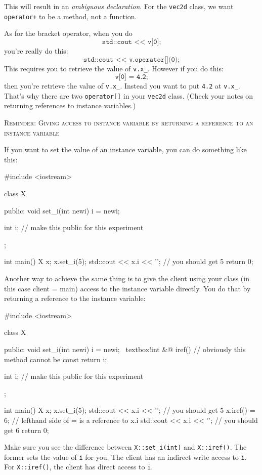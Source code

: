 This will result in an \textit{ambiguous declaration}.
For the \verb!vec2d! class, we want \verb!operator+! to be a method,
not a function.

As for the bracket operator, when you do
\[
	\texttt{std::cout << v[0];}
\]
you're really do this:
\[
	\texttt{std::cout << v.operator[](0);}
\]
This requires you to retrieve the value of \verb!v.x_!.
However if you do this:
\[
	\texttt{v[0] = 4.2;}
\]
then you're retrieve the value of \verb!v.x_!.
Instead you want to put \verb!4.2! at \verb!v.x_!.
That's why there are two \verb!operator[]! in your
\verb!vec2d! class.
(Check your notes on returning references to instance variables.)

\newpage
\textsc{Reminder: Giving access to instance variable by returning a reference
  to an instance variable}

If you want to set the value of an instance variable, you can do something
like this:
{\small
\begin{console}
#include <iostream>

class X
{
public:
    void set_i(int newi)
    {
        i = newi;
    }

    int i; // make this public for this experiment
};

int main()
{
    X x;
    x.set_i(5);
    std::cout << x.i << '\n'; // you should get 5
    return 0;
}
\end{console}
}
Another way to achieve the same thing is to give the client using your
class (in this
case client = main) access to the instance variable directly. You do that by
returning a reference to the instance variable:
{\small
\begin{console}[commandchars=\~\!\@]
#include <iostream>

class X
{
public:
    void set_i(int newi)
    {
        i = newi;
    }
    ~textbox!int &@ iref() // obviously this method cannot be const
    {
        return i;
    }

    int i; // make this public for this experiment
};

int main()
{
    X x;
    x.set_i(5);
    std::cout << x.i << '\n'; // you should get 5
    x.iref() = 6;             // lefthand side of = is a reference to x.i
    std::cout << x.i << '\n'; // you should get 6
    return 0;
}
\end{console}
}

Make sure you see the difference between \verb!X::set_i(int)! and
\verb!X::iref()!.
The former sets the value of \verb!i! for you.
The client has an indirect write access to \verb!i!.
For \verb!X::iref()!, the client has direct access to \verb!i!.

